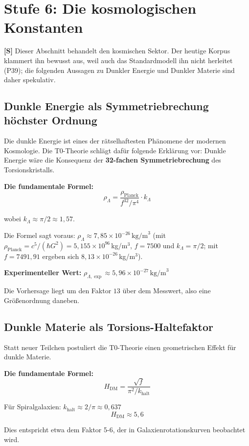 	\section{Stufe 6: Die kosmologischen Konstanten}

	\textbf{[S]} Dieser Abschnitt behandelt den kosmischen Sektor. Der heutige Korpus klammert ihn bewusst aus, weil auch das Standardmodell ihn nicht herleitet (P39); die folgenden Aussagen zu Dunkler Energie und Dunkler Materie sind daher spekulativ.
	
	\subsection{Dunkle Energie als Symmetriebrechung höchster Ordnung}
	
	Die dunkle Energie ist eines der rätselhaftesten Phänomene der modernen Kosmologie. Die T0-Theorie schlägt dafür folgende Erklärung vor: Dunkle Energie wäre die Konsequenz der \textbf{32-fachen Symmetriebrechung} des Torsionskristalls.
	
	\textbf{Die fundamentale Formel:}
	\begin{equation}
		\boxed{\rho_\Lambda = \frac{\rho_{\text{Planck}}}{f^{32} / \pi^4} \cdot k_\Lambda}
	\end{equation}
	
	wobei \(k_\Lambda \approx \pi/2 \approx 1{,}57\).
	
	Die Formel sagt voraus: \(\rho_\Lambda \approx 7{,}85 \times 10^{-26}\,\text{kg/m}^3\) (mit $\rho_{\text{Planck}} = c^5/(\hbar G^2) = 5{,}155\times10^{96}$\,kg/m$^3$, $f = 7500$ und $k_\Lambda = \pi/2$; mit $f = 7491{,}91$ ergeben sich $8{,}13\times10^{-26}$\,kg/m$^3$).
	
	\textbf{Experimenteller Wert:} \(\rho_{\Lambda,\exp} \approx 5{,}96 \times 10^{-27}\,\text{kg/m}^3\)
	
	Die Vorhersage liegt um den Faktor $13$ über dem Messwert, also eine Größenordnung daneben.
	
	\subsection{Dunkle Materie als Torsions-Haltefaktor}
	
	Statt neuer Teilchen postuliert die T0-Theorie einen geometrischen Effekt für dunkle Materie.
	
	\textbf{Die fundamentale Formel:}
	\begin{equation}
		\boxed{H_{\text{DM}} = \frac{\sqrt{f}}{\pi^2/k_{\text{halt}}}}
	\end{equation}
	
	Für Spiralgalaxien: \(k_{\text{halt}} \approx 2/\pi \approx 0{,}637\)
	\begin{equation}
		H_{\text{DM}} \approx 5{,}6
	\end{equation}
	
	Dies entspricht etwa dem Faktor 5-6, der in Galaxienrotationskurven beobachtet wird.
